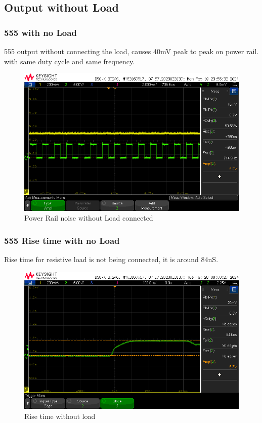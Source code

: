 \documentclass[a4paper,11pt]{article}%
\begin{document}
\subsection{Output without Load}


\subsubsection{555 with no Load}
555 output without connecting the load, causes 40mV peak to peak on power rail. with same duty cycle and same frequency.
\begin{figure}[H]
	\centering
	\includegraphics[scale=0.5]{figures/without_load.png}
	\caption{Power Rail noise without Load connected}
\end{figure}


\subsubsection{555 Rise time with no Load}
Rise time for resistive load is not being connected, it is around 84nS.
\begin{figure}[H]
	\centering
	\includegraphics[scale=0.5]{figures/rise_without_load.png}
	\caption{Rise time without load}
\end{figure}
\end{document}
